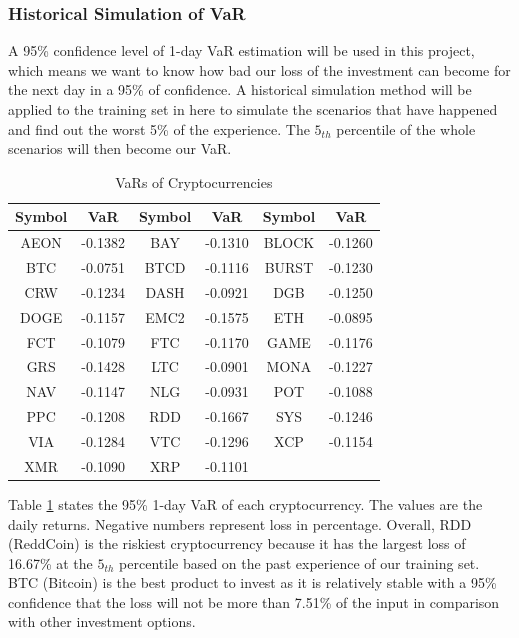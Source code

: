 \documentclass[11pt]{article} %
\theoremstyle{plain}
\theoremstyle{definition}
\begin{document}
\subsubsection{Historical Simulation of VaR}

A 95\% confidence level of 1-day VaR estimation will be used in this project, which means we want to know how bad our loss of the investment can become for the next day in a 95\% of confidence. A historical simulation method will be applied to the training set in here to simulate the scenarios that have happened and find out the worst 5\% of the experience. The $5_{th}$ percentile of the whole scenarios will then become our VaR.

{
  \begin{table}[ht]
    \centering
    \small
    \begin{tabular}{|c|c|c|c|c|c|}
        \hline
        Symbol & VaR & Symbol & VaR & Symbol & VaR \\
        \hline
        AEON & -0.1382 & BAY & -0.1310 & BLOCK & -0.1260 \\
        BTC & -0.0751 & BTCD & -0.1116 & BURST & -0.1230 \\
        CRW & -0.1234 & DASH & -0.0921 & DGB & -0.1250 \\
        DOGE & -0.1157 & EMC2 & -0.1575 & ETH & -0.0895 \\
        FCT & -0.1079 & FTC & -0.1170 & GAME & -0.1176 \\
        GRS & -0.1428 & LTC & -0.0901 & MONA & -0.1227 \\
        NAV & -0.1147 & NLG & -0.0931 & POT & -0.1088 \\
        PPC & -0.1208 & RDD & -0.1667 & SYS & -0.1246 \\
        VIA & -0.1284 & VTC & -0.1296 & XCP & -0.1154 \\
        XMR & -0.1090 & XRP & -0.1101 & & \\
        \hline
    \end{tabular}
    \caption{VaRs of Cryptocurrencies}
    \label{table:varcrypto}
  \end{table}
}

Table \ref{table:varcrypto} states the 95\% 1-day VaR of each cryptocurrency. The values are the daily returns. Negative numbers represent loss in percentage. Overall, RDD (ReddCoin) is the riskiest cryptocurrency because it has the largest loss of 16.67\% at the $5_{th}$ percentile based on the past experience of our training set. BTC (Bitcoin) is the best product to invest as it is relatively stable with a 95\% confidence that the loss will not be more than 7.51\% of the input in comparison with other investment options.
\end{document}
